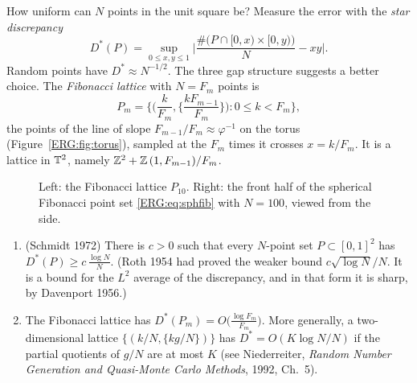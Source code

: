 How uniform can $N$ points in the unit square be? Measure the error with the \emph{star discrepancy}
\[
  D^*(P)=\sup_{0\le x,y\le1}\Big|\frac{\#\big(P\cap[0,x)\times[0,y)\big)}{N}-xy\Big| .
\]
Random points have $D^*\approx N^{-1/2}$. The three gap structure suggests a better choice. The
\emph{Fibonacci lattice} with $N=F_m$ points is
\[
  P_m=\Big\{\Big(\frac{k}{F_m},\Big\{\frac{kF_{m-1}}{F_m}\Big\}\Big):0\le k<F_m\Big\},
\]
the points of the line of slope $F_{m-1}/F_m\approx\varphi^{-1}$ on the torus
(Figure~\ref{ERG:fig:torus}), sampled at the $F_m$ times it crosses $x=k/F_m$. It is a lattice in
$\mathbb{T}^2$, namely $\mathbb{Z}^2+\mathbb{Z}\,(1,F_{m-1})/F_m$.

\begin{figure}[ht]
\centering
{}
\qquad
{}
\caption{Left: the Fibonacci lattice $P_{10}$. Right: the front half of the spherical Fibonacci point set
\eqref{ERG:eq:sphfib} with $N=100$, viewed from the side.}
\label{ERG:fig:fib}
\end{figure}

\begin{theorem}\label{ERG:thm:discrepancy}\leavevmode
\begin{enumerate}[nosep]
\item (Schmidt 1972) There is $c>0$ such that every $N$-point set $P\subset[0,1]^2$ has
  $D^*(P)\ge c\,\frac{\log N}{N}$. (Roth 1954 had proved the weaker bound $c\sqrt{\log N}/N$. It is a bound for the
  $L^2$ average of the discrepancy, and in that form it is sharp, by Davenport 1956.)
\item The Fibonacci lattice has $D^*(P_m)=O\big(\frac{\log F_m}{F_m}\big)$. More generally, a
  two-dimensional lattice $\{(k/N,\{kg/N\})\}$ has $D^*=O(K\log N/N)$ if the partial quotients of
  $g/N$ are at most $K$ (see Niederreiter, \emph{Random Number Generation and Quasi-Monte Carlo
  Methods}, 1992, Ch.~5).
\end{enumerate}
\end{theorem}

